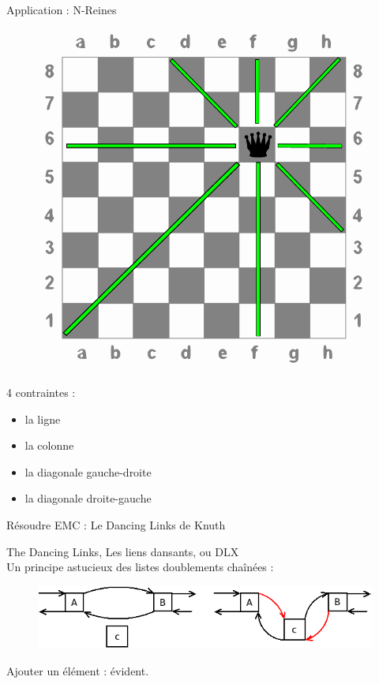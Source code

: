 \documentclass{beamer}
\begin{document}
\begin{frame}{Application : N-Reines}
\begin{figure}[h]
\begin{center}
\includegraphics[height=0.4\textheight]{../imports/8queens.pdf}
\end{center}
\end{figure}

4 contraintes : 
\begin{itemize}
\item la ligne
\item la colonne
\item la diagonale gauche-droite
\item la diagonale droite-gauche
\end{itemize}

\end{frame}


\begin{frame}{Résoudre EMC : Le Dancing Links de Knuth}

The Dancing Links, Les liens dansants, ou DLX\\
Un principe astucieux des listes doublements chaînées : 
\begin{figure}[h]
\begin{center}
\includegraphics[scale=0.5]{../imports/add_elmt_dll.png}
\end{center}
\end{figure}
Ajouter un élément : évident.
\end{frame}
\end{document}
